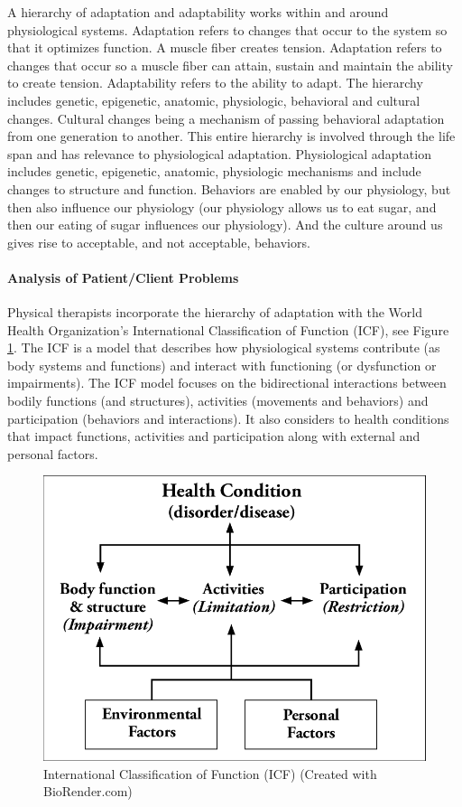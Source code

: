 A hierarchy of adaptation and adaptability works within and around physiological systems. Adaptation refers to changes that occur to the system so that it optimizes function. A muscle fiber creates tension. Adaptation refers to changes that occur so a muscle fiber can attain, sustain and maintain the ability to create tension. Adaptability refers to the ability to adapt. The hierarchy includes genetic, epigenetic, anatomic, physiologic, behavioral and cultural changes. Cultural changes being a mechanism of passing behavioral adaptation from one generation to another. This entire hierarchy is involved through the life span and has relevance to physiological adaptation. Physiological adaptation includes genetic, epigenetic, anatomic, physiologic mechanisms and include changes to structure and function. Behaviors are enabled by our physiology, but then also influence our physiology (our physiology allows us to eat sugar, and then our eating of sugar influences our physiology). And the culture around us gives rise to acceptable, and not acceptable, behaviors. 

\paragraph{Analysis of Patient/Client Problems}
Physical therapists incorporate the hierarchy of adaptation with the World Health Organization's International Classification of Function (ICF), see Figure \ref{fig:icf}. The ICF is a model that describes how physiological systems contribute (as body systems and functions) and interact with functioning (or dysfunction or impairments). The ICF model focuses on the bidirectional interactions between bodily functions (and structures), activities (movements and behaviors) and participation (behaviors and interactions). It also considers to health conditions that impact functions, activities and participation along with external and personal factors. 

\begin{figure}[!ht]
    \centering
    \includegraphics[width=1\linewidth]{./figure/ICF.png}
    \caption{International Classification of Function (ICF) \footnotesize{(Created with BioRender.com)}}
    \label{fig:icf}
\end{figure}

